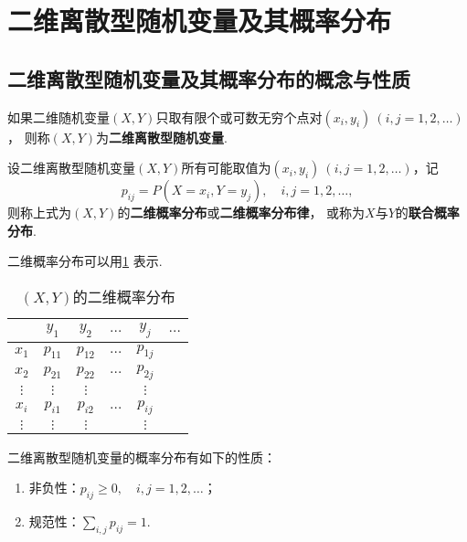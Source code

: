 \section{二维离散型随机变量及其概率分布}

\subsection{二维离散型随机变量及其概率分布的概念与性质}
\begin{definition}
如果二维随机变量\((X,Y)\)只取有限个或可数无穷个点对\((x_i,y_i)\ (i,j=1,2,\dotsc)\)，%
则称\((X,Y)\)为\textbf{二维离散型随机变量}.
\end{definition}

\begin{definition}
设二维离散型随机变量\((X,Y)\)所有可能取值为\((x_i,y_i)\ (i,j=1,2,\dotsc)\)，记\[
p_{ij} = P(X = x_i, Y = y_j), \quad i,j = 1,2,\dotsc,
\]则称上式为\((X,Y)\)的\textbf{二维概率分布}或\textbf{二维概率分布律}，%
或称为\(X\)与\(Y\)的\textbf{联合概率分布}.
\end{definition}

二维概率分布可以用\cref{table:多维随机变量及其分布.二维概率分布} 表示.

\begin{table}[ht]
\centering
\begin{tabular}{c|*5c}
	& \(y_1\) & \(y_2\) & \(\dots\) & \(y_j\) & \(\dots\) \\ \hline
\(x_1\) & \(p_{11}\) & \(p_{12}\) & \(\dots\) & \(p_{1j}\) \\
\(x_2\) & \(p_{21}\) & \(p_{22}\) & \(\dots\) & \(p_{2j}\) \\
\(\vdots\) & \(\vdots\) & \(\vdots\) & & \(\vdots\) \\
\(x_i\) & \(p_{i1}\) & \(p_{i2}\) & \(\dots\) & \(p_{ij}\) \\
\(\vdots\) & \(\vdots\) & \(\vdots\) & & \(\vdots\) \\
\end{tabular}
\caption{\((X,Y)\)的二维概率分布}
\label{table:多维随机变量及其分布.二维概率分布}
\end{table}

\begin{property}
二维离散型随机变量的概率分布有如下的性质：
\begin{enumerate}
\item 非负性：\(p_{ij} \geqslant 0, \quad i,j=1,2,\dotsc\)；
\item 规范性：\(\sum_{i,j} p_{ij} = 1\).
\end{enumerate}
\end{property}


